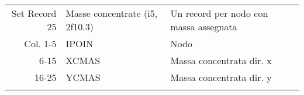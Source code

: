 \begin{tabular}{rll}
	Set Record 25& Masse concentrate (i5, 2f10.3) & Un record per nodo con massa assegnata            \\
	Col.  1-5    & IPOIN                          & Nodo                                              \\
	6-15    & XCMAS                          & Massa concentrata dir. x                          \\
	16-25    & YCMAS                          & Massa concentrata dir. y                          \\
	&                                &                                                   \\
\end{tabular}
